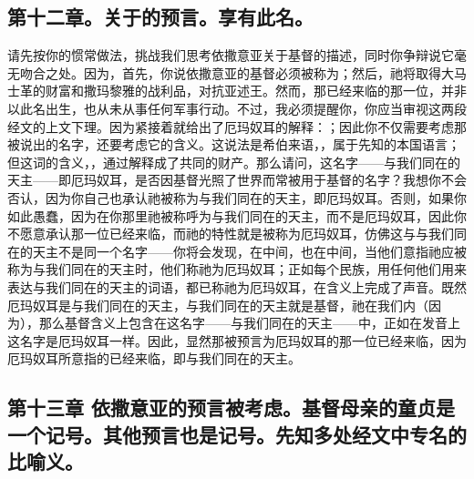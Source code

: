
\subsection{第十二章。关于的预言。享有此名。}

请先按你的惯常做法，挑战我们思考依撒意亚关于基督的描述，同时你争辩说它毫无吻合之处。因为，首先，你说依撒意亚的基督必须被称为；然后，祂将取得大马士革的财富和撒玛黎雅的战利品，对抗亚述王。然而，那已经来临的那一位，并非以此名出生，也从未从事任何军事行动。不过，我必须提醒你，你应当审视这两段经文的上文下理。因为紧接着就给出了厄玛奴耳的解释：；因此你不仅需要考虑那被说出的名字，还要考虑它的含义。这说法是希伯来语，，属于先知的本国语言；但这词的含义，，通过解释成了共同的财产。那么请问，这名字——与我们同在的天主——即厄玛奴耳，是否因基督光照了世界而常被用于基督的名字？我想你不会否认，因为你自己也承认祂被称为与我们同在的天主，即厄玛奴耳。否则，如果你如此愚蠢，因为在你那里祂被称呼为与我们同在的天主，而不是厄玛奴耳，因此你不愿意承认那一位已经来临，而祂的特性就是被称为厄玛奴耳，仿佛这与与我们同在的天主不是同一个名字——你将会发现，在中间，也在中间，当他们意指祂应被称为与我们同在的天主时，他们称祂为厄玛奴耳；正如每个民族，用任何他们用来表达与我们同在的天主的词语，都已称祂为厄玛奴耳，在含义上完成了声音。既然厄玛奴耳是与我们同在的天主，与我们同在的天主就是基督，祂在我们内（因为），那么基督含义上包含在这名字——与我们同在的天主——中，正如在发音上这名字是厄玛奴耳一样。因此，显然那被预言为厄玛奴耳的那一位已经来临，因为厄玛奴耳所意指的已经来临，即与我们同在的天主。\par


\subsection{第十三章 依撒意亚的预言被考虑。基督母亲的童贞是一个记号。其他预言也是记号。先知多处经文中专名的比喻义。}

